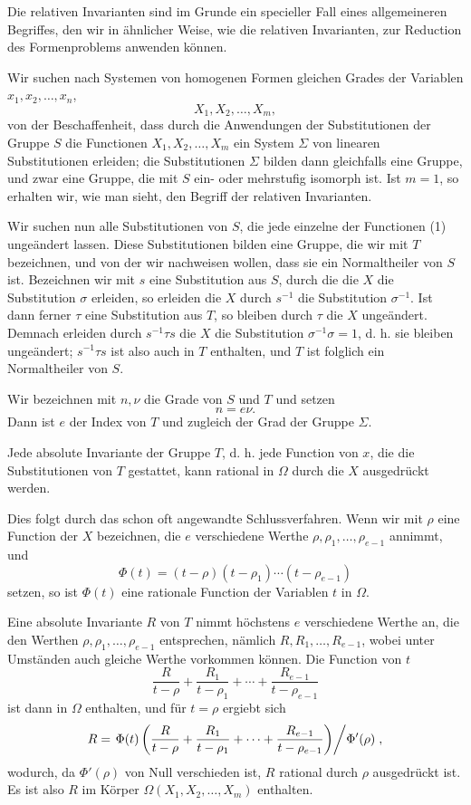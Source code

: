 \documentclass[11pt]{article}
\begin{document}
Die relativen Invarianten sind im Grunde ein specieller Fall eines allgemeineren Begriffes, den wir in ähnlicher Weise, wie die relativen Invarianten, zur Reduction des Formenproblems anwenden können.

Wir suchen nach Systemen von homogenen Formen gleichen Grades der Variablen $x_1,x_2,\ldots,x_n$,
\begin{equation}
X_1,X_2,\ldots,X_m,
\tag{1}
\end{equation}
von der Beschaffenheit, dass durch die Anwendungen der Substitutionen der Gruppe $S$ die Functionen $X_1,X_2,\ldots,X_m$ ein System $\Sigma$ von linearen Substitutionen erleiden; die Substitutionen $\Sigma$ bilden dann gleichfalls eine Gruppe, und zwar eine Gruppe, die mit $S$ ein- oder mehrstufig isomorph ist. Ist $m=1$, so erhalten wir, wie man sieht, den Begriff der relativen Invarianten.

Wir suchen nun alle Substitutionen von $S$, die jede einzelne der Functionen (1) ungeändert lassen. Diese Substitutionen bilden eine Gruppe, die wir mit $T$ bezeichnen, und von der wir nachweisen wollen, dass sie ein Normaltheiler von $S$ ist. Bezeichnen wir mit $s$ eine Substitution aus $S$, durch die die $X$ die Substitution $\sigma$ erleiden, so erleiden die $X$ durch $s^{-1}$ die Substitution $\sigma^{-1}$. Ist dann ferner $\tau$ eine Substitution aus $T$, so bleiben durch $\tau$ die $X$ ungeändert. Demnach erleiden durch $s^{-1}\tau s$ die $X$ die Substitution $\sigma^{-1}\sigma=1$, d. h. sie bleiben ungeändert; $s^{-1}\tau s$ ist also auch in $T$ enthalten, und $T$ ist folglich ein Normaltheiler von $S$.

Wir bezeichnen mit $n,\nu$ die Grade von $S$ und $T$ und setzen
\[
n=e\nu.
\]
Dann ist $e$ der Index von $T$ und zugleich der Grad der Gruppe $\Sigma$.

Jede absolute Invariante der Gruppe $T$, d. h. jede Function von $x$, die die Substitutionen von $T$ gestattet, kann rational in $\Omega$ durch die $X$ ausgedrückt werden.

Dies folgt durch das schon oft angewandte Schlussverfahren. Wenn wir mit $\rho$ eine Function der $X$ bezeichnen, die $e$ verschiedene Werthe $\rho,\rho_1,\ldots,\rho_{e-1}$ annimmt, und
\begin{equation}
\Phi(t)=(t-\rho)(t-\rho_1)\cdots(t-\rho_{e-1})
\tag{2}
\end{equation}
setzen, so ist $\Phi(t)$ eine rationale Function der Variablen $t$ in $\Omega$.

Eine absolute Invariante $R$ von $T$ nimmt höchstens $e$ verschiedene Werthe an, die den Werthen $\rho,\rho_1,\ldots,\rho_{e-1}$ entsprechen, nämlich $R,R_1,\ldots,R_{e-1}$, wobei unter Umständen auch gleiche Werthe vorkommen können. Die Function von $t$
\[
\frac{R}{t-\rho}+\frac{R_1}{t-\rho_1}+\cdots+\frac{R_{e-1}}{t-\rho_{e-1}}
\]
ist dann in $\Omega$ enthalten, und für $t=\rho$ ergiebt sich
\[
R=\left.\Phi(t)\left(\frac{R}{t-\rho}+\frac{R_1}{t-\rho_1}+\cdots+\frac{R_{e-1}}{t-\rho_{e-1}}\right)\middle/\Phi'(\rho)\right. ,
\]
wodurch, da $\Phi'(\rho)$ von Null verschieden ist, $R$ rational durch $\rho$ ausgedrückt ist. Es ist also $R$ im Körper $\Omega(X_1,X_2,\ldots,X_m)$ enthalten.
\end{document}
